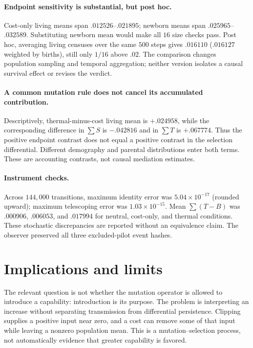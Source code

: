 \documentclass[10pt]{article}
\begin{document}
\paragraph{Endpoint sensitivity is substantial, but post hoc.}
Cost-only living means span $.012526$--$.021895$; newborn means span $.025965$--$.032589$. Substituting newborn mean would make all $16$ size checks pass. Post hoc, averaging living censuses over the same $500$ steps gives $.016110$ ($.016127$ weighted by births), still only $1/16$ above $.02$. The comparison changes population sampling and temporal aggregation; neither version isolates a causal survival effect or revises the verdict.

\paragraph{A common mutation rule does not cancel its accumulated contribution.}
Descriptively, thermal-minus-cost living mean is $+.024958$, while the corresponding difference in $\sum S$ is $-.042816$ and in $\sum T$ is $+.067774$. Thus the positive endpoint contrast does not equal a positive contrast in the selection differential. Different demography and parental distributions enter both terms. These are accounting contrasts, not causal mediation estimates.

\paragraph{Instrument checks.}
Across $144{,}000$ transitions, maximum identity error was $5.04\times10^{-17}$ (rounded upward); maximum telescoping error was $1.03\times10^{-15}$. Mean $\sum(T-B)$ was $.000906$, $.006053$, and $.017994$ for neutral, cost-only, and thermal conditions. These stochastic discrepancies are reported without an equivalence claim. The observer preserved all three excluded-pilot event hashes.

\newpage
\section{Implications and limits}
The relevant question is not whether the mutation operator is allowed to introduce a capability: introduction is its purpose. The problem is interpreting an increase without separating transmission from differential persistence. Clipping supplies a positive input near zero, and a cost can remove some of that input while leaving a nonzero population mean. This is a mutation--selection process, not automatically evidence that greater capability is favored.
\end{document}
